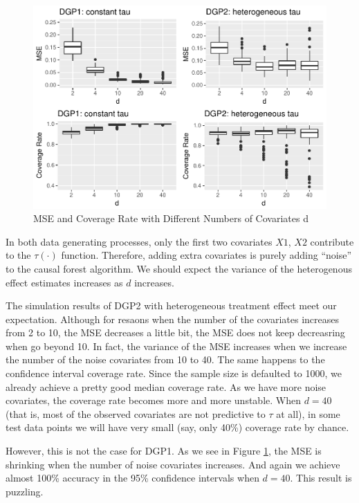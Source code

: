 \documentclass[]{article}
\begin{document}
\begin{figure}
\includegraphics{report_files/figure-latex/fig3-1} \caption{\label{fig:fig3}MSE and Coverage Rate with Different Numbers of Covariates d}\label{fig:fig3}
\end{figure}

In both data generating processes, only the first two covariates \(X1\),
\(X2\) contribute to the \(\tau(\cdot)\) function. Therefore, adding
extra covariates is purely adding ``noise'' to the causal forest
algorithm. We should expect the variance of the heterogenous effect
estimates increases as \(d\) increases.

The simulation results of DGP2 with heterogeneous treatment effect meet
our expectation. Although for resaons when the number of the covariates
increases from 2 to 10, the MSE decreases a little bit, the MSE does not
keep decreasring when go beyond 10. In fact, the variance of the MSE
increases when we increase the number of the noise covariates from 10 to
40. The same happens to the confidence interval coverage rate. Since the
sample size is defaulted to 1000, we already achieve a pretty good
median coverage rate. As we have more noise covariates, the coverage
rate becomes more and more unstable. When \(d=40\) (that is, most of the
observed covariates are not predictive to \(\tau\) at all), in some test
data points we will have very small (say, only 40\%) coverage rate by
chance.

However, this is not the case for DGP1. As we see in Figure
\ref{fig:fig3}, the MSE is shrinking when the number of noise covariates
increases. And again we achieve almost 100\% accuracy in the 95\%
confidence intervals when \(d=40\). This result is puzzling.
\end{document}
